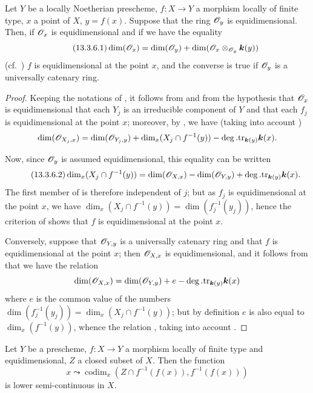 \begin{proposition}[13.3.6]
\label{IV.13.3.6}
Let $Y$ be a locally Noetherian prescheme, $f:X\to Y$ a morphism locally of finite type, $x$ a point of $X$, $y=f(x)$.
Suppose that the ring $\mathscr{O}_y$ is equidimensional. Then, if $\mathscr{O}_x$ is equidimensional and if we have the equality
\[
\tag{13.3.6.1}
\label{IV.13.3.6.1}
  \dim(\mathscr{O}_x)=\dim(\mathscr{O}_y)+\dim(\mathscr{O}_x\otimes_{\mathscr{O}_y}\boldsymbol{k}(y))
\]
(cf.\ ) $f$ is equidimensional at the point $x$, and the converse is true if $\mathscr{O}_y$ is a universally catenary ring.
\end{proposition}

\begin{proof}
Keeping the notations of , it follows from  and from the hypothesis that $\mathscr{O}_x$ is equidimensional that each $Y_j$ is an irreducible component of $Y$ and that each $f_j$ is equidimensional at the point $x$; moreover, by , we have (taking into account )
\[
  \dim(\mathscr{O}_{X_j,x})=\dim(\mathscr{O}_{Y_j,y})+\dim_x(X_j\cap f^{-1}(y))-\deg.\mathrm{tr}_{\boldsymbol{k}(y)}\boldsymbol{k}(x).
\]


Now, since $\mathscr{O}_y$ is assumed equidimensional, this equality can be written
\[
\tag{13.3.6.2}
\label{IV.13.3.6.2}
  \dim_x(X_j\cap f^{-1}(y))=\dim(\mathscr{O}_{X,x})-\dim(\mathscr{O}_{Y,y})+\deg.\mathrm{tr}_{\boldsymbol{k}(y)}\boldsymbol{k}(x).
\]
The first member of  is therefore independent of $j$; but as $f_j$ is equidimensional at the point $x$, we have $\dim_x(X_j\cap f^{-1}(y))=\dim(f_j^{-1}(y_j))$, hence the criterion of  shows that $f$ is equidimensional at the point $x$.

Conversely, suppose that $\mathscr{O}_{Y,y}$ is a universally catenary ring and that $f$ is equidimensional at the point $x$; then  $\mathscr{O}_{X,x}$ is equidimensional, and it follows from  that we have the relation
\[
  \dim(\mathscr{O}_{X,x})=\dim(\mathscr{O}_{Y,y})+e-\deg.\mathrm{tr}_{\boldsymbol{k}(y)}\boldsymbol{k}(x)
\]
where $e$ is the common value of the numbers $\dim(f_j^{-1}(y_j))=\dim_x(X_j\cap f^{-1}(y))$; but by definition $e$ is also equal to $\dim_x(f^{-1}(y))$, whence the relation , taking into account .
\end{proof}

\begin{proposition}[13.3.7]
\label{IV.13.3.7}
Let $Y$ be a prescheme, $f:X\to Y$ a morphism locally of finite type and equidimensional, $Z$ a closed subset of $X$.
Then the function
\[
\label{IV.13.3.7.1}
\tag{13.3.7.1}
  x\leadsto\operatorname{codim}_x(Z\cap f^{-1}(f(x)),f^{-1}(f(x)))
\]
is lower semi-continuous in $X$.
\end{proposition}

